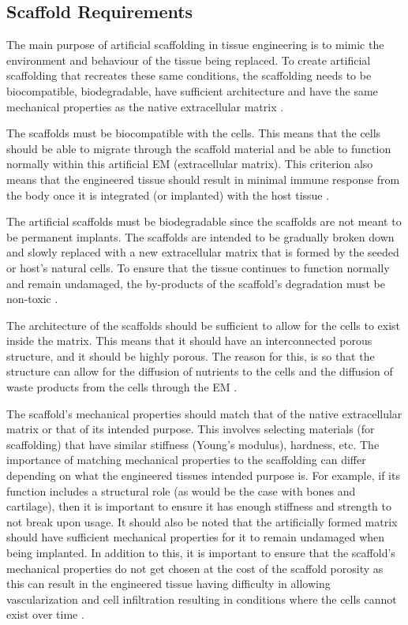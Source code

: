 \subsection{Scaffold Requirements}
The main purpose of artificial scaffolding in tissue engineering is to mimic the environment and behaviour of the tissue being replaced. To create artificial scaffolding that recreates these same conditions, the scaffolding needs to be biocompatible, biodegradable, have sufficient architecture and have the same mechanical properties as the native extracellular matrix \citep{obrien_2011}.

The scaffolds must be biocompatible with the cells. This means that the cells should be able to migrate through the scaffold material and be able to function normally within this artificial EM (extracellular matrix). This criterion also means that the engineered tissue should result in minimal immune response from the body once it is integrated (or implanted) with the host tissue \citep{obrien_2011}.

The artificial scaffolds must be biodegradable since the scaffolds are not meant to be permanent implants. The scaffolds are intended to be gradually broken down and slowly replaced with a new extracellular matrix that is formed by the seeded or host’s natural cells. To ensure that the tissue continues to function normally and remain undamaged, the by-products of the scaffold’s degradation must be non-toxic \citep{obrien_2011}.

The architecture of the scaffolds should be sufficient to allow for the cells to exist inside the matrix. This means that it should have an interconnected porous structure, and it should be highly porous. The reason for this, is so that the structure can allow for the diffusion of nutrients to the cells and the diffusion of waste products from the cells through the EM \citep{obrien_2011}.

The scaffold’s mechanical properties should match that of the native extracellular matrix or that of its intended purpose. This involves selecting materials (for scaffolding) that have similar stiffness (Young’s modulus), hardness, etc. The importance of matching mechanical properties to the scaffolding can differ depending on what the engineered tissues intended purpose is. For example, if its function includes a structural role (as would be the case with bones and cartilage), then it is important to ensure it has enough stiffness and strength to not break upon usage. It should also be noted that the artificially formed matrix should have sufficient mechanical properties for it to remain undamaged when being implanted. In addition to this, it is important to ensure that the scaffold’s mechanical properties do not get chosen at the cost of the scaffold porosity as this can result in the engineered tissue having difficulty in allowing vascularization and cell infiltration resulting in conditions where the cells cannot exist over time \citep{obrien_2011}.

